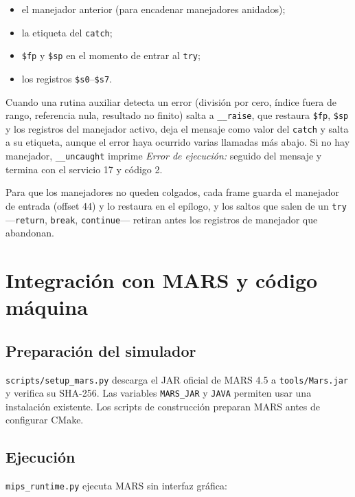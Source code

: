 \documentclass[11pt,a4paper]{article}
\begin{document}
\begin{itemize}[leftmargin=1.4em]
  \item el manejador anterior (para encadenar manejadores anidados);
  \item la etiqueta del \texttt{catch};
  \item \texttt{\$fp} y \texttt{\$sp} en el momento de entrar al \texttt{try};
  \item los registros \texttt{\$s0}--\texttt{\$s7}.
\end{itemize}

Cuando una rutina auxiliar detecta un error (división por cero, índice fuera de
rango, referencia nula, resultado no finito) salta a \texttt{\_\_raise}, que
restaura \texttt{\$fp}, \texttt{\$sp} y los registros del manejador activo, deja
el mensaje como valor del \texttt{catch} y salta a su etiqueta, aunque el error
haya ocurrido varias llamadas más abajo. Si no hay manejador,
\texttt{\_\_uncaught} imprime \emph{Error de ejecución:} seguido del mensaje y
termina con el servicio 17 y código 2.

Para que los manejadores no queden colgados, cada frame guarda el manejador de
entrada (offset 44) y lo restaura en el epílogo, y los saltos que salen de un
\texttt{try} ---\texttt{return}, \texttt{break}, \texttt{continue}--- retiran
antes los registros de manejador que abandonan.

\section{Integración con MARS y código máquina}

\subsection{Preparación del simulador}

\texttt{scripts/setup\_mars.py} descarga el JAR oficial de MARS 4.5 a
\texttt{tools/Mars.jar} y verifica su SHA-256. Las variables \texttt{MARS\_JAR}
y \texttt{JAVA} permiten usar una instalación existente. Los scripts de
construcción preparan MARS antes de configurar CMake.

\subsection{Ejecución}

\texttt{mips\_runtime.py} ejecuta MARS sin interfaz gráfica:
\end{document}
